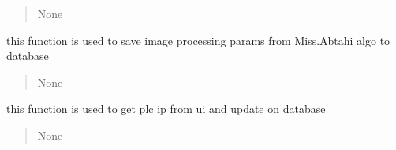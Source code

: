 \documentclass[letterpaper,10pt,english]{sphinxmanual}
\begin{document}
\begin{savenotes}
\begin{fulllineitems}
\begin{savenotes}
\begin{fulllineitems}
\begin{quote}
\begin{description}
\sphinxAtStartPar
None

\end{description}\end{quote}

\end{fulllineitems}\end{savenotes}


\begin{savenotes}\begin{fulllineitems}
\label{\detokenize{setting/setting_api:oxin.setting_api.API.save_image_processing_parms}}
\pysigstartsignatures
{}
\pysigstopsignatures
\sphinxAtStartPar
this function is used to save image processing params from Miss.Abtahi algo to database
\begin{quote}\begin{description}
\sphinxAtStartPar
None

\end{description}\end{quote}

\end{fulllineitems}\end{savenotes}


\begin{savenotes}\begin{fulllineitems}
\label{\detokenize{setting/setting_api:oxin.setting_api.API.save_plc_ip}}
\pysigstartsignatures
{}
\pysigstopsignatures
\sphinxAtStartPar
this function is used to get plc ip from ui and update on database
\begin{quote}\begin{description}
\sphinxAtStartPar
None

\end{description}\end{quote}

\end{fulllineitems}\end{savenotes}


\end{fulllineitems}
\end{savenotes}
\end{document}
